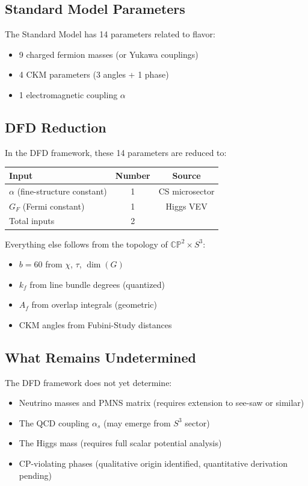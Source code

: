 \documentclass[11pt,a4paper]{article}
\newcommand{\CP}{\mathbb{CP}}
\begin{document}
\subsection{Standard Model Parameters}

The Standard Model has 14 parameters related to flavor:
\begin{itemize}
\item 9 charged fermion masses (or Yukawa couplings)
\item 4 CKM parameters (3 angles + 1 phase)
\item 1 electromagnetic coupling $\alpha$
\end{itemize}

\subsection{DFD Reduction}

In the DFD framework, these 14 parameters are reduced to:

\begin{table}[h]
\centering
\begin{tabular}{lcc}
\toprule
Input & Number & Source \\
\midrule
$\alpha$ (fine-structure constant) & 1 & CS microsector \\
$G_F$ (Fermi constant) & 1 & Higgs VEV \\
\midrule
Total inputs & 2 & \\
\bottomrule
\end{tabular}
\end{table}

Everything else follows from the topology of $\CP^2 \times S^3$:
\begin{itemize}
\item $b = 60$ from $\chi$, $\tau$, $\dim(G)$
\item $k_f$ from line bundle degrees (quantized)
\item $A_f$ from overlap integrals (geometric)
\item CKM angles from Fubini-Study distances
\end{itemize}

\subsection{What Remains Undetermined}

The DFD framework does not yet determine:
\begin{itemize}
\item Neutrino masses and PMNS matrix (requires extension to see-saw or similar)
\item The QCD coupling $\alpha_s$ (may emerge from $S^3$ sector)
\item The Higgs mass (requires full scalar potential analysis)
\item CP-violating phases (qualitative origin identified, quantitative derivation pending)
\end{itemize}
\end{document}
